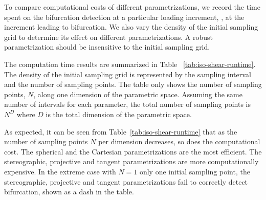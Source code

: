 \documentclass[12pt]{article}
\numberwithin{equation}{section}
\begin{document}
To compare computational costs of different parametrizations, we
record the time spent on the bifurcation detection at a particular
loading increment, \eg, at the increment leading to bifurcation. We
also vary the density of the initial sampling grid to determine its
effect on different parametrizations. A robust parametrization should
be insensitive to the initial sampling grid.

The computation time results are summarized in Table~
\ref{tab:iso-shear-runtime}. The density of the initial sampling grid
is represented by the sampling interval and the number of sampling
points. The table only shows the number of sampling points, $N$, along
one dimension of the parametric space. Assuming the same number of
intervals for each parameter, the total number of sampling points is
$N^{D}$ where $D$ is the total dimension of the parametric space.

As expected, it can be seen from Table~\ref{tab:iso-shear-runtime}
that as the number of sampling points $N$ per dimension decreases, so
does the computational cost. The spherical and the Cartesian
parametrizations are the most efficient. The stereographic, projective
and tangent parametrizations are more computationally expensive. In
the extreme case with $N=1$ \ie only one initial sampling point, the
stereographic, projective and tangent parametrizations fail to
correctly detect bifurcation, shown as a dash in the table.
\end{document}
